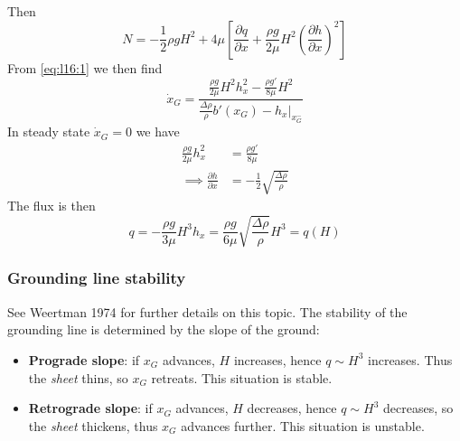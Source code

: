 \documentclass{jknotes}
\begin{document}
Then
\begin{equation}
	N = -\frac{1}{2}\rho g H^2 + 4\mu \left[ \frac{\partial q}{\partial x} +
	\frac{\rho g}{2\mu} H^2 \left(\frac{\partial h}{\partial
	x}\right)^2\right]
\end{equation}
From \eqref{eq:l16:1} we then find
\begin{equation}
	\dot{x}_G = \frac{\frac{\rho g}{2\mu} H^2 h_x^2 - \frac{\rho g'}{8\mu}
	H^2}{\frac{\Delta \rho}{\rho}b'(x_G) - \left.h_x\right|_{x_G^-}}
\end{equation}
In steady state $\dot{x}_G = 0$ we have
\begin{align}
	\frac{\rho g}{2\mu} h_x^2 &= \frac{\rho g'}{8\mu} \\
	\implies \frac{\partial h}{\partial x} &= -\frac{1}{2}\sqrt{\frac{\Delta
	\rho}{\rho}}
\end{align}
The flux is then
\begin{equation}
	q = -\frac{\rho g}{3\mu} H^3 h_x = \frac{\rho g}{6\mu} \sqrt{\frac{\Delta
	\rho}{\rho}} H^3 = q(H)
\end{equation}

\subsubsection{Grounding line stability}
See Weertman 1974 for further details on this topic. The stability of the
grounding line is determined by the slope of the ground:
\begin{itemize}
	\item \textbf{Prograde slope}: if $x_G$ advances, $H$ increases, hence $q
		\sim H^3$ increases. Thus the \emph{sheet} thins, so $x_G$ retreats.
		This situation is stable.
		\begin{center}
		\end{center}
	\item \textbf{Retrograde slope}: if $x_G$ advances, $H$ decreases, hence
		$q \sim H^3$ decreases, so the \emph{sheet} thickens, thus $x_G$
		advances further. This situation is unstable.
		\begin{center}
		\end{center}
\end{itemize}
\end{document}
